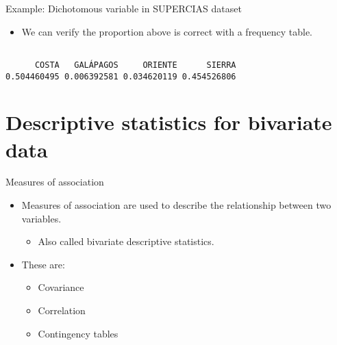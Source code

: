 \documentclass[
  10pt,
  ignorenonframetext,
]{beamer}
\newenvironment{Shaded}{\begin{snugshade}}{\end{snugshade}}
\newcommand{\FunctionTok}[1]{\textcolor[rgb]{0.28,0.35,0.67}{#1}}
\newcommand{\NormalTok}[1]{\textcolor[rgb]{0.00,0.23,0.31}{#1}}
\newcommand{\SpecialCharTok}[1]{\textcolor[rgb]{0.37,0.37,0.37}{#1}}
\providecommand{\tightlist}{%
  \setlength{\itemsep}{0pt}\setlength{\parskip}{0pt}}\usepackage{longtable,booktabs,array}
\begin{document}
\begin{frame}[fragile]{Example: Dichotomous variable in SUPERCIAS
dataset}
\label{example-dichotomous-variable-in-supercias-dataset-1}
\begin{itemize}
\tightlist
\item
  We can verify the proportion above is correct with a frequency table.
\end{itemize}

\begin{Shaded}
\end{Shaded}

\begin{verbatim}

      COSTA   GALÁPAGOS     ORIENTE      SIERRA 
0.504460495 0.006392581 0.034620119 0.454526806 
\end{verbatim}
\end{frame}

\section{Descriptive statistics for bivariate
data}\label{descriptive-statistics-for-bivariate-data}

\begin{frame}{Measures of association}
\label{measures-of-association}
\begin{itemize}
\tightlist
\item
  Measures of association are used to describe the relationship between
  two variables.

  \begin{itemize}
  \tightlist
  \item
    Also called bivariate descriptive statistics.
  \end{itemize}
\item
  These are:

  \begin{itemize}
  \tightlist
  \item
    Covariance
  \item
    Correlation
  \item
    Contingency tables
  \end{itemize}
\end{itemize}
\end{frame}
\end{document}
